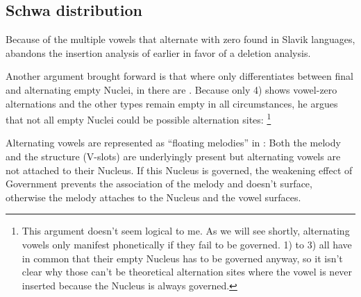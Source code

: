 \subsection{Schwa distribution}

Because of the multiple vowels that alternate with zero found in Slavik
languages, \cite{scheer2004} abandons the insertion analysis of earlier
\SGP in favor of a deletion analysis.

Another argument brought forward is that where \SGP only differentiates
between final and alternating empty Nuclei, in \CVCV there are
.
Because only 4) shows vowel-zero alternations and the other types
remain empty in all circumstances, he argues that not all empty
Nuclei could be possible alternation sites:
%
\footnote{This argument doesn't seem logical to me.
  As we will see shortly, alternating vowels only manifest phonetically
  if they fail to be governed. 1) to 3) all have in common
  that their empty Nucleus has to be governed anyway, so it isn't
  clear why those can't be theoretical alternation sites where
  the vowel is never inserted because the Nucleus is always governed.}

Alternating vowels are represented as \enquote{floating melodies} in \CVCV:
Both the melody and the structure (V-slots) are underlyingly present
but alternating vowels are not attached to their Nucleus.
If this Nucleus is governed, the weakening effect of Government
prevents the association of the melody and doesn't surface, otherwise
the melody attaches to the Nucleus and the vowel surfaces.


